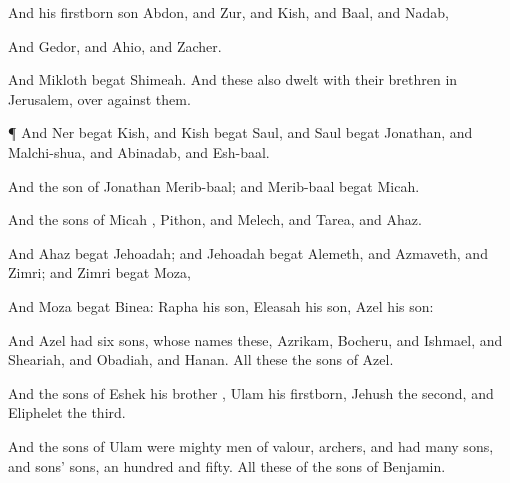 {And his
firstborn
son
Abdon, and
Zur, and
Kish, and
Baal, and
Nadab,

And
Gedor, and
Ahio, and
Zacher.

And
Mikloth
begat
Shimeah. And these
also
dwelt with their
brethren in
Jerusalem, over against
them.


\par }{\PP {}¶ And
Ner
begat
Kish, and
Kish
begat
Saul, and
Saul
begat
Jonathan, and
Malchi-shua, and
Abinadab, and
Esh-baal.

And the
son of
Jonathan
{}
Merib-baal; and
Merib-baal
begat
Micah.

And the
sons of
Micah
{},
Pithon, and
Melech, and
Tarea, and
Ahaz.

And
Ahaz
begat
Jehoadah; and
Jehoadah
begat
Alemeth, and
Azmaveth, and
Zimri; and
Zimri
begat
Moza,

And
Moza
begat
Binea:
Rapha
{} his
son,
Eleasah his
son,
Azel his
son:

And
Azel had
six
sons, whose
names
{} these,
Azrikam,
Bocheru, and
Ishmael, and
Sheariah, and
Obadiah, and
Hanan. All these
{} the
sons of
Azel.

And the
sons of
Eshek his
brother
{},
Ulam his
firstborn,
Jehush the
second, and
Eliphelet the
third.

And the
sons of
Ulam were
mighty
men of
valour,
archers, and had
many
sons, and
sons’
sons, an
hundred and
fifty. All these
{} of the
sons of
Benjamin.




\par }
